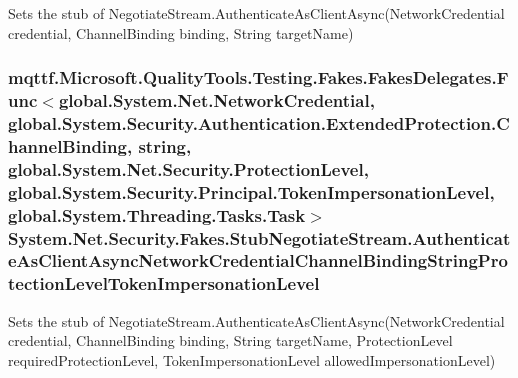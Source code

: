 Sets the stub of Negotiate\-Stream.\-Authenticate\-As\-Client\-Async(\-Network\-Credential credential, Channel\-Binding binding, String target\-Name)

\hypertarget{class_system_1_1_net_1_1_security_1_1_fakes_1_1_stub_negotiate_stream_acc5765a60382f1421df0043262b988e6}{
\subsubsection[{Authenticate\-As\-Client\-Async\-Network\-Credential\-Channel\-Binding\-String\-Protection\-Level\-Token\-Impersonation\-Level}]{\setlength{\rightskip}{0pt plus 5cm}mqttf.\-Microsoft.\-Quality\-Tools.\-Testing.\-Fakes.\-Fakes\-Delegates.\-Func$<$global.\-System.\-Net.\-Network\-Credential, global.\-System.\-Security.\-Authentication.\-Extended\-Protection.\-Channel\-Binding, string, global.\-System.\-Net.\-Security.\-Protection\-Level, global.\-System.\-Security.\-Principal.\-Token\-Impersonation\-Level, global.\-System.\-Threading.\-Tasks.\-Task$>$ System.\-Net.\-Security.\-Fakes.\-Stub\-Negotiate\-Stream.\-Authenticate\-As\-Client\-Async\-Network\-Credential\-Channel\-Binding\-String\-Protection\-Level\-Token\-Impersonation\-Level}}\label{class_system_1_1_net_1_1_security_1_1_fakes_1_1_stub_negotiate_stream_acc5765a60382f1421df0043262b988e6}


Sets the stub of Negotiate\-Stream.\-Authenticate\-As\-Client\-Async(\-Network\-Credential credential, Channel\-Binding binding, String target\-Name, Protection\-Level required\-Protection\-Level, Token\-Impersonation\-Level allowed\-Impersonation\-Level)

